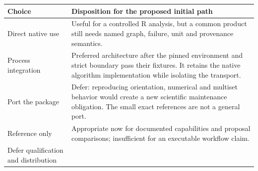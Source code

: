 \begin{longtable}[]{@{}ll@{}}
\toprule
\begin{minipage}[b]{0.47\columnwidth}\raggedright
Choice\strut
\end{minipage} & \begin{minipage}[b]{0.47\columnwidth}\raggedright
Disposition for the proposed initial path\strut
\end{minipage}\tabularnewline
\midrule
\endhead
\begin{minipage}[t]{0.47\columnwidth}\raggedright
Direct native use\strut
\end{minipage} & \begin{minipage}[t]{0.47\columnwidth}\raggedright
Useful for a controlled R analysis, but a common product still needs
named graph, failure, unit and provenance semantics.\strut
\end{minipage}\tabularnewline
\begin{minipage}[t]{0.47\columnwidth}\raggedright
Process integration\strut
\end{minipage} & \begin{minipage}[t]{0.47\columnwidth}\raggedright
Preferred architecture after the pinned environment and strict boundary
pass their fixtures. It retains the native algorithm implementation
while isolating the transport.\strut
\end{minipage}\tabularnewline
\begin{minipage}[t]{0.47\columnwidth}\raggedright
Port the package\strut
\end{minipage} & \begin{minipage}[t]{0.47\columnwidth}\raggedright
Defer: reproducing orientation, numerical and multiset behavior would
create a new scientific maintenance obligation. The small exact
references are not a general port.\strut
\end{minipage}\tabularnewline
\begin{minipage}[t]{0.47\columnwidth}\raggedright
Reference only\strut
\end{minipage} & \begin{minipage}[t]{0.47\columnwidth}\raggedright
Appropriate now for documented capabilities and proposal comparisons;
insufficient for an executable workflow claim.\strut
\end{minipage}\tabularnewline
\begin{minipage}[t]{0.47\columnwidth}\raggedright
Defer qualification and distribution\strut
\end{minipage} & \begin{minipage}[t]{0.47\columnwidth}\raggedright

\end{minipage}
\end{longtable}

